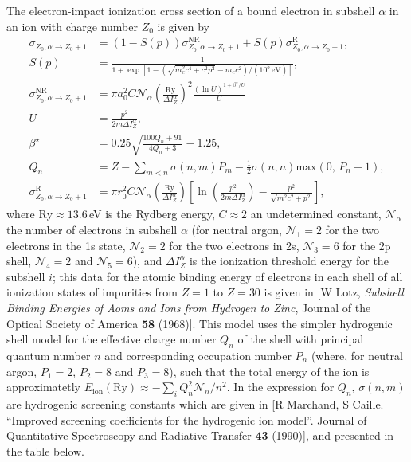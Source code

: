 \documentclass[11pt,a4paper]{article}
\newcommand{\sub}[1]{\ensuremath{_{\text{#1}}}}
\begin{document}
The electron-impact ionization cross section of a bound electron in subshell $\alpha$ in an ion with charge number $Z_0$ is given by
\begin{align}
\sigma_{Z_0,\alpha \to  Z_0+1}& = (1-S(p))\sigma_{Z_0,\alpha \to  Z_0+1}^\text{NR} + S(p) \sigma_{Z_0,\alpha\to Z_0+1}^\text{R}, \nonumber \\
S(p) &= \frac{1}{1+ \exp[ 1 - (\sqrt{m_e^2 c^4+c^2 p^2}-m_e c^2)/(10^5\,\text{eV})]}, \nonumber \\
\sigma_{Z_0,\alpha\to Z_0+1}^\text{NR} &= \pi a_0^2 C \mathcal{N}_\alpha \left(\frac{\text{Ry}}{\Delta I_Z^\alpha}\right)^2\frac{(\ln U)^{1+\beta^\star/U}}{U} \nonumber \\
U &= \frac{p^2}{2m\Delta I_Z^\alpha}, \nonumber \\
\beta^\star &= 0.25\sqrt{\frac{100Q_n+91}{4Q_n+3}}-1.25, \nonumber \\
Q_n &=  Z - \sum_{m<n} \sigma(n,m) P_m - \frac{1}{2}\sigma(n,n)\text{max}(0,\,P_n-1), \nonumber \\
\sigma_{Z_0,\alpha\to Z_0+1}^\text{R} &= \pi r_0^2 C \mathcal{N}_\alpha\left(\frac{\text{Ry}}{\Delta I_Z^\alpha}\right) \left[\ln\left(\frac{p^2}{2m\Delta I_Z^\alpha}\right) - \frac{p^2}{\sqrt{m^2c^2+p^2}}\right],
\end{align}
where $\text{Ry} \approx 13.6\,$eV is the Rydberg energy, $C \approx 2$ an undetermined constant, $\mathcal{N}_\alpha$ the number of electrons in subshell $\alpha$ (for neutral argon, $\mathcal{N}_1 = 2$ for the two electrons in the 1s state, $\mathcal{N}_2 = 2$ for the two electrons in 2s, $\mathcal{N}_3=6$ for the 2p shell, $\mathcal{N}_4 = 2$ and $\mathcal{N}_5=6$), and $\Delta I_Z^\alpha$ is the ionization threshold energy for the subshell $i$; this data for the atomic binding energy of electrons in each shell of all ionization states of impurities from $Z=1$ to $Z=30$ is given in [W Lotz, \emph{Subshell Binding Energies of Aoms and Ions from Hydrogen to Zinc}, Journal of the Optical Society of America {\bf 58} (1968)]. This model uses the simpler hydrogenic shell model for the effective charge number $Q_n$ of the shell with principal quantum number $n$ and corresponding occupation number $P_n$ (where, for neutral argon, $P_1=2$, $P_2 = 8$ and $P_3 = 8$), such that the total energy of the ion is approximatetly $E\sub{ion}(\text{Ry}) \approx - \sum_i Q_n^2\mathcal{N}_n/n^2$. In the expression for $Q_n$, $\sigma(n,m)$ are hydrogenic screening constants which are given in [R Marchand, S Caille. ``Improved screening coefficients for the hydrogenic ion model''. Journal of Quantitative Spectroscopy and Radiative Transfer {\bf 43} (1990)], and presented in the table below.
\end{document}

